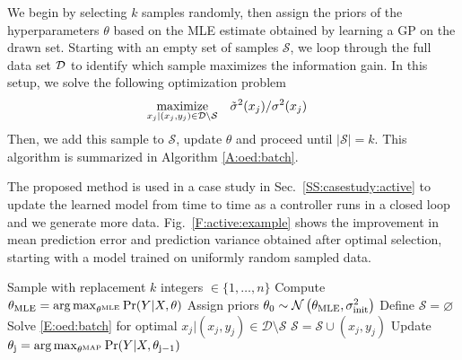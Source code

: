 We begin by selecting \(k\) samples randomly, %
then assign the priors of the hyperparameters \(\theta\) based on the MLE estimate obtained by learning a GP on the drawn set.
Starting with an empty set of samples \(\mathcal{S}\), %
we loop through the full data set \(\mathcal{D}\) to identify which sample maximizes the information gain. In this setup, we solve the following optimization problem
\begin{align}
\label{E:oed:batch}
\maximize_{x_{j}|(x_j,y_j) \in \mathcal{D} \setminus \mathcal{S}} & \ \ \ \tilde{\sigma}^2(x_j)/{\sigma}^2(x_j) 
\end{align}
Then, we add this sample to \(\mathcal{S}\), update \(\theta\) and proceed until \(|\mathcal{S}|=k\).
This algorithm is summarized in Algorithm \ref{A:oed:batch}. 

The proposed method is used in a case study in Sec.~\ref{SS:casestudy:active} to update the learned model from time to time as a controller runs in a closed loop and we generate more data.
Fig.~\ref{F:active:example} shows the improvement in mean prediction error and prediction variance obtained after optimal selection, starting with a model trained on uniformly random sampled data. %

\begin{algorithm}[!tb]
	\caption{Optimal subset of data selection}
	\label{A:oed:batch}
	\begin{algorithmic}[1]
		\State Sample with replacement \(k\) integers \( \in \{1,\dots,n\} \)
		\State Compute \( \theta_{\mathrm{MLE}} = \operatorname*{arg\,max}_{\theta^{\mathrm{MLE}}} \Pr(Y \vert X, \theta)\)
		\State Assign priors \(\theta_{\mathrm{0}} \sim \operatorname*{\mathcal{N}}\left(\theta_{\mathrm{MLE}}, \sigma^2_{\mathrm{init}}\right)\)
		\EndProcedure
		\State Define \(\mathcal{S} = \varnothing\)
		\State Solve \eqref{E:oed:batch} for optimal \({x_{j} \vert (x_j,y_j) \in \mathcal{D} \setminus \mathcal{S}} \)
		\State \(\mathcal{S} = \mathcal{S} \cup (x_j,y_j) \)
		\State Update \( \theta_{\mathrm{j}} = \operatorname*{arg\,max}_{\theta^{\mathrm{MAP}}} \Pr(Y \vert X, \theta_{\mathrm{j-1}})\)
		\EndWhile
		\EndProcedure
	\end{algorithmic}
\end{algorithm}

\begin{figure*}[t]
	\centering
	\setlength{} 
	\setlength{}
	 \hspace{0.5cm}
	
	\caption{Left: Selection using random sampling. Right: Optimal subset of data selection. Starting with the model parameters obtained using random sampling, we apply Algorithm \ref{A:oed:batch} to improve the model accuracy. Both the mean prediction error and the prediction variance are lower for optimal selection based on information gain. }
	\captionsetup{justification=centering}
    \vspace{-10pt}    
	\label{F:active:example}
\end{figure*}


